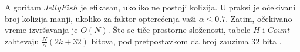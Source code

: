 \documentclass[12pt,oneside]{memoir}
\begin{document}
\begin{comment}

\begin{figure}[!ht]
  \centering
  \texttt{[image: 58\_3algoritma.PNG]}
  \caption{Razmatra se skup 4-mera $Z = \{AC; CG; AC; GT; CA; GG; AC; GT\}$: (a) Ilustruje jednostavan metod za brojanje k-mera koji koristi tabelu \textit{Count} veličine 4k. (b) Ilustruje \textit{JellyFish} metod brojanja k-mera koja koristi heš tabelu veličine 7. Heš funkcija je $h(z) = b(z)$ \textit{mod} $7$. Na primer, $GT$ se čuva u tabeli $Count$ sa indeksom 4, jer je $h(GT) = 4$. U ovom primeru se javlja jedna kolizija. Pošto je i $h(CA) = 4$, $CA$ je u koliziji sa $GT$. Linearnim isprobavanjem $CA$ se ipak čuva u tabeli $Count$ sa indeksom 5. (c) Ilustruje DSK metod brojanja k-mera.
Pretpostavka je da je $h(z) = b(z)$, $n_{list} = 2$ i $n_{sublist} = 2$. DSK deli Z u
4 ($= n_{list} * n_{sublist}$) podliste, a zatim pokreće \textit{JellyFish} algoritam za brojanje k-mera u svakoj podlisti.}
  \label{fig:5}
  \source{\cite{WingKinSung}}
\end{figure}

Slika \ref{fig:5}(b) daje primer koji ilustruje algoritam $JellyFish$. 
\end{comment}

Algoritam $JellyFish$ je efikasan, ukoliko ne postoji kolizija. U praksi je očekivani broj kolizija manji, ukoliko za faktor opterećenja važi $\alpha \leq 0.7$. Zatim, očekivano vreme izvršavanja je $O(N)$. Što se tiče prostorne složenosti, tabele $H$ i $Count$ zahtevaju $\frac{N}{\alpha}(2k + 32)$ bitova, pod pretpostavkom da broj zauzima 32 bita \cite{WingKinSung}.

\end{document}
